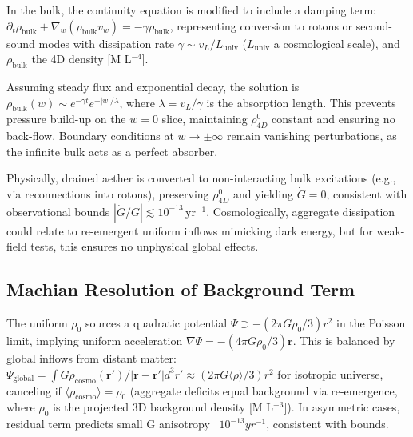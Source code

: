 \documentclass{article}
\begin{document}
In the bulk, the continuity equation is modified to include a damping term: $\partial_t \rho_{\text{bulk}} + \nabla_w (\rho_{\text{bulk}} v_w) = -\gamma \rho_{\text{bulk}}$, representing conversion to rotons or second-sound modes with dissipation rate $\gamma \sim v_L / L_{\text{univ}}$ ($L_{\text{univ}}$ a cosmological scale), and $\rho_{\text{bulk}}$ the 4D density [M L$^{-4}$].

Assuming steady flux and exponential decay, the solution is $\rho_{\text{bulk}}(w) \sim e^{-\gamma t} e^{-|w| / \lambda}$, where $\lambda = v_L / \gamma$ is the absorption length. This prevents pressure build-up on the $w=0$ slice, maintaining $\rho_{4D}^0$ constant and ensuring no back-flow. Boundary conditions at $w \to \pm \infty$ remain vanishing perturbations, as the infinite bulk acts as a perfect absorber.

Physically, drained aether is converted to non-interacting bulk excitations (e.g., via reconnections into rotons), preserving $\rho_{4D}^0$ and yielding $\dot{G} = 0$, consistent with observational bounds $|\dot{G}/G| \lesssim 10^{-13} \, \mathrm{yr}^{-1}$. Cosmologically, aggregate dissipation could relate to re-emergent uniform inflows mimicking dark energy, but for weak-field tests, this ensures no unphysical global effects.

\subsection{Machian Resolution of Background Term}

The uniform $\rho_0$ sources a quadratic potential $\Psi \supset - (2\pi G \rho_0 / 3) r^2$ in the Poisson limit, implying uniform acceleration $\nabla \Psi = - (4\pi G \rho_0 / 3) \mathbf{r}$. This is balanced by global inflows from distant matter: $\Psi_{\text{global}} = \int G \rho_{\text{cosmo}}(\mathbf{r}') / |\mathbf{r} - \mathbf{r}'| d^3 r' \approx (2\pi G \langle \rho \rangle / 3) r^2$ for isotropic universe, canceling if $\langle \rho_{\text{cosmo}} \rangle = \rho_0$ (aggregate deficits equal background via re-emergence, where $\rho_0$ is the projected 3D background density [M L$^{-3}$]). In asymmetric cases, residual term predicts small G anisotropy ~$10^{-13} yr^{-1}$, consistent with bounds.
\end{document}
